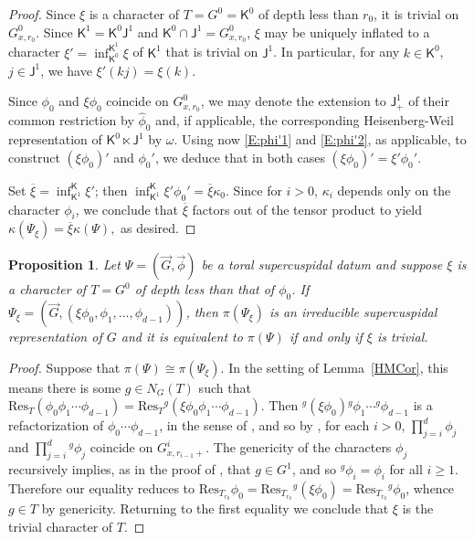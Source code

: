 \documentclass[12pt]{amsart}
\newcommand{\Res}{\mathrm{Res}} %
\newcommand{\KT}{\mathsf{K}}
\newcommand{\J}{\mathsf{J}}
\theoremstyle{plain}
\newtheorem{proposition}[theorem]{Proposition}
\theoremstyle{definition}
\theoremstyle{remark}
\numberwithin{equation}{section}
\numberwithin{figure}{section}
\begin{document}
\begin{proof}
Since $\xi$ is a character of $T=G^0=\KT^0$ of depth less than $r_0$, it is trivial on $G^0_{x,r_0}$.  Since $\KT^1=\KT^0\J^1$ and $\KT^0\cap \J^1 = G^0_{x,r_0}$, $\xi$ may be uniquely inflated to a character $\xi' = \inf_{\KT^0}^{\KT^1}\xi$ of $\KT^1$ that is trivial on $\J^1$. In particular, for any $k\in \KT^0$, $j\in \J^{1}$, we have $\xi'(kj)=\xi(k)$.

Since $\phi_0$ and $\xi\phi_0$ coincide on $G^0_{x,r_0}$, we may denote the extension to $\J^1_+$ of their common restriction by $\hat\phi_0$ and, if applicable, the corresponding Heisenberg-Weil representation of $\KT^0 \ltimes \J^1$  by $\omega$.  
Using now  \eqref{E:phi'1} and \eqref{E:phi'2}, as applicable, to construct $(\xi\phi_0)'$ and $\phi_0'$, we deduce that in both cases $(\xi\phi_0)' = \xi' \phi_0'$.

Set $\overline{\xi} = \inf_{\KT^1}^{\KT}\xi'$; then  $\inf_{\KT^1}^{\KT}\xi'\phi_0' = \overline{\xi}\kappa_0$.  Since for $i>0$, $\kappa_i$ depends only on the character $\phi_i$, we conclude that $\overline{\xi}$ factors out of the tensor product to yield $
\kappa(\Psi_\xi) = \overline{\xi}\kappa(\Psi),
$ as desired.
\end{proof}




\begin{proposition} \label{P:inequiv}
Let $\Psi = (\vec{G},\vec{\phi})$ be a toral supercuspidal datum and suppose $\xi$ is a character of $T=G^0$ of depth less than that of $\phi_0$.  If $\Psi_\xi = (\vec{G}, (\xi\phi_0, \phi_1,\ldots,\phi_{d-1}))$,  then $\pi(\Psi_\xi)$ is an irreducible supercuspidal representation of $G$ and it is equivalent to $\pi(\Psi)$ if and only if $\xi$ is trivial. 
\end{proposition}

\begin{proof}
Suppose that $\pi(\Psi) \cong \pi(\Psi_\xi)$.  In the setting of Lemma~\ref{HMCor}, this means there is some $g \in N_G(T)$ such that $\Res_{T}(\phi_0 \phi_1 \cdots \phi_{d-1})=\Res_{T}{}^g(\xi \phi_0 \phi_1 \cdots \phi_{d-1})$.   
Then ${}^g(\xi\phi_0){}^g\phi_1\cdots {}^g \phi_{d-1}$ is a refactorization of $\phi_0\cdots \phi_{d-1}$, in the sense of \cite[Definition 5.3]{Murnaghan2011}, and so by \cite[Proposition 5.4]{Murnaghan2011}, for each $i>0$, $\prod_{j=i}^d \phi_j$ and $\prod_{j=i}^d {}^g\phi_j$ coincide on $G^i_{x,r_{i-1}+}$.  
The genericity of the characters $\phi_j$ recursively implies, as in the proof of \cite[Proposition 5.6]{Murnaghan2011}, that $g\in G^1$, and so ${}^g\phi_i=\phi_i$ for all $i\geq 1$.
Therefore our equality reduces to $\Res_{T_{r_0}} \phi_0 = \Res_{T_{r_0}} {}^g(\xi\phi_0) =  \Res_{T_{r_0}} {}^g\phi_0$, whence $g\in T$ by genericity.  Returning to the first equality we conclude that $\xi$ is the trivial character of $T$.
\end{proof}
\end{document}
